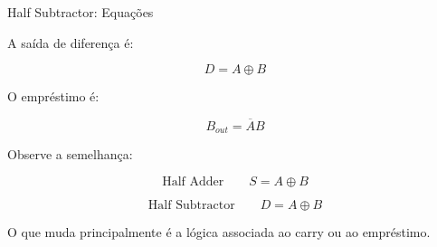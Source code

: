 \begin{frame}{Half Subtractor: Equações}

    A saída de diferença é:

    \[
        \boxed{D=A\oplus B}
    \]

    O empréstimo é:

    \[
        \boxed{B_{out}=\overline{A}B}
    \]

    \vspace{0.5cm}

    Observe a semelhança:

    \[
        \text{Half Adder}
        \qquad
        S=A\oplus B
    \]

    \[
        \text{Half Subtractor}
        \qquad
        D=A\oplus B
    \]

    O que muda principalmente é a lógica associada ao
    carry ou ao empréstimo.

\end{frame}